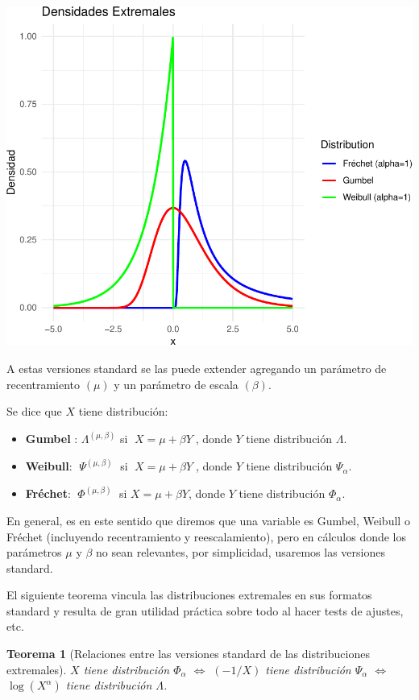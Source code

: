 \documentclass[
  20pt,
]{book}
\newtheorem{theorem}{Teorema}[chapter]
\theoremstyle{definition}
\theoremstyle{definition}
\theoremstyle{definition}
\theoremstyle{definition}
\theoremstyle{remark}
\begin{document}
\includegraphics{Extremales_files/figure-latex/plot-extreme-distributions-1.pdf}

A estas versiones standard se las puede extender
agregando un parámetro de recentramiento \((\mu)\) y
un parámetro de escala \((\beta)\).

Se dice que \(X\) tiene distribución:

\begin{itemize}
\item
  \textbf{Gumbel} : \(\Lambda^{(\mu, \beta)}\) si \(\;X=\mu + \beta Y\;\), donde \(Y\) tiene distribución \(\Lambda\).
\item
  \textbf{Weibull}: \(\;\Psi^{(\mu, \beta)}\;\) si \(\;X=\mu + \beta Y\;\), donde \(Y\) tiene distribución \(\Psi_{\alpha}\).
\item
  \textbf{Fréchet}: \(\;\Phi^{(\mu, \beta)}\;\) si \(X=\mu + \beta Y\), donde \(Y\) tiene distribución \(\Phi_{\alpha}\).
\end{itemize}

En general, es en este sentido que diremos que una
variable es Gumbel, Weibull o Fréchet (incluyendo
recentramiento y reescalamiento), pero en cálculos
donde los parámetros \(\mu\) y \(\beta\) no sean relevantes, por
simplicidad, usaremos las versiones standard.

El siguiente teorema vincula las distribuciones
extremales en sus formatos standard y resulta de
gran utilidad práctica sobre todo al hacer tests de
ajustes, etc.

\begin{theorem}[Relaciones entre las versiones standard de las distribuciones extremales]
\protect\hypertarget{thm:foo1}{}\label{thm:foo1}\(X\) tiene distribución \(\Phi_{\alpha}\) \(\Leftrightarrow\) \((-1/X)\) tiene distribución \(\Psi_{\alpha}\) \(\Leftrightarrow\) \(\log(X^{\alpha})\) tiene distribución \(\Lambda\).
\end{theorem}
\end{document}
